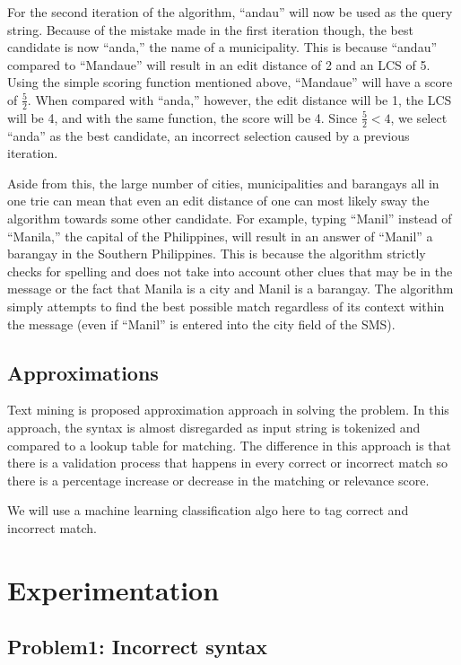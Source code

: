 \documentclass{acm_proc_article-sp}
\begin{document}
For the second iteration of the algorithm, ``andau'' will now be used as the query string. Because of the mistake made in the first iteration though, the best candidate is now ``anda,'' the name of a municipality. This is because ``andau'' compared to ``Mandaue'' will result in an edit distance of 2 and an LCS of 5. Using the simple scoring function mentioned above, ``Mandaue'' will have a score of $\frac{5}{2}$.  When compared with ``anda,'' however, the edit distance will be 1, the LCS will be 4, and with the same function, the score will be 4. Since $\frac{5}{2} < 4$, we select ``anda'' as the best candidate, an incorrect selection caused by a previous iteration. 

Aside from this, the large number of cities, municipalities and barangays all in one trie can mean that even an edit distance of one can most likely sway the algorithm towards some other candidate. For example, typing ``Manil'' instead of ``Manila,'' the capital of the Philippines, will result in an answer of ``Manil'' a barangay in the Southern Philippines. This is because the algorithm strictly checks for spelling and does not take into account other clues that may be in the message or the fact that Manila is a city and Manil is a barangay. The algorithm simply attempts to find the best possible match regardless of its context within the message (even if ``Manil'' is entered into the city field of the SMS). 

\subsection{Approximations}
Text mining is proposed approximation approach in solving the problem. In this approach, the syntax is almost disregarded as input string is tokenized and compared to a lookup table for matching. The difference in this approach is that there is a validation process that happens in every correct or incorrect match so there is a percentage increase or decrease in the matching or relevance score. 

We will use a machine learning classification algo here to tag correct and incorrect match.

\section{Experimentation}
\subsection{Problem1: Incorrect syntax}
\end{document}
